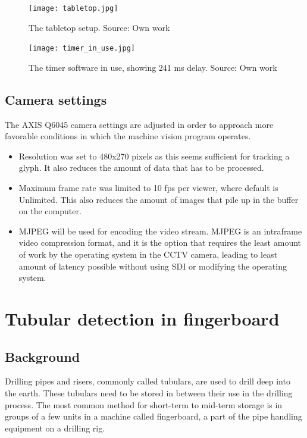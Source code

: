 \begin{figure}[ht]
    \centering
    \texttt{[image: tabletop.jpg]}
    \caption{The tabletop setup. Source: Own work}
    \label{fig:tabletop}
\end{figure}

\begin{figure}[ht]
    \centering
    \texttt{[image: timer\_in\_use.jpg]}
    \caption{The timer software in use, showing 241 ms delay. Source: Own work}
    \label{fig:timer_in_use}
\end{figure}

\subsection{Camera settings}
The AXIS Q6045 camera settings are adjusted in order to approach more favorable conditions in which the machine vision program operates.

\begin{itemize}
\item Resolution was set to 480x270 pixels as this seems sufficient for tracking a glyph. It also reduces the amount of data that has to be processed.
\item Maximum frame rate was limited to 10 fps per viewer, where default is Unlimited. This also reduces the amount of images that pile up in the buffer on the computer.
\item MJPEG will be used for encoding the video stream. MJPEG is an intraframe video compression format, and it is the option that requires the least amount of work by the operating system in the CCTV camera, leading to least amount of latency possible without using SDI or modifying the operating system.
\end{itemize}

\section{Tubular detection in fingerboard}
\subsection{Background}
Drilling pipes and risers, commonly called tubulars, are used to drill deep into the earth. These tubulars need to be stored in between their use in the drilling process. The most common method for short-term to mid-term storage is in groups of a few units in a machine called fingerboard, a part of the pipe handling equipment on a drilling rig.

